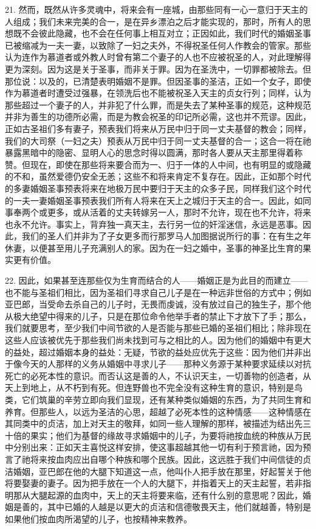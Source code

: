 21. 然而，既然从许多灵魂中，将来会有一座城，由那些同有一心一意归于天主的人组成；我们未来完美的合一，是在异乡漂泊之后才能实现的，那时，所有人的思想既不会彼此隐藏，也不会在任何事上相互对立；正因如此，我们时代的婚姻圣事已被缩减为一夫一妻，以致除了一妇之夫外，不得祝圣任何人作教会的管家。那些认为连作为慕道者或外教人时曾有第二个妻子的人也不应被祝圣的人，对此理解得更为深刻。因为这是关于圣事，而非关于罪。因为在圣洗中，一切罪都被除去。但那位说：以及的，已清楚表明婚姻不是罪。但因圣事的圣洁，正如一个女子，即使作为慕道者时遭受过强暴，在领洗后也不能被祝圣入天主的贞女行列；同样，认为那些超过一个妻子的人，并非犯了什么罪，而是失去了某种圣事的规范，这种规范并非为善生的功德所必需，而是为教会祝圣的印记所必需，这也并不荒谬。因此，正如古圣祖们多有妻子，预表我们将来从万民中归于同一丈夫基督的教会；同样，我们的大司祭（一妇之夫）预表从万民中归于同一丈夫基督的合一；这合一将在祂暴露黑暗中的隐密、显明人心的思念时得以圆满，那时各人要从天主那里得着称赞。但现在，即使在那些将来要合而为一、归于一体的人中间，也有明显的或隐藏的不和，虽然爱德仍安全无恙；这些不和将来肯定不复存在。因此，正如那个时代的多妻婚姻圣事预表将来在地极万民中要归于天主的众多子民，同样我们这个时代的一夫一妻婚姻圣事预表我们所有人将来在天上之城归于天主的合一。因此，如同事奉两个或更多，或从活着的丈夫转嫁另一人，那时不允许，现在也不允许，将来也永不允许。事实上，背弃独一真天主，去行另一位的奸淫迷信，永远是恶事。因此，我们的圣人们并非为了子女更多而行那罗马人加图据说所行的事：在有生之年休妻，以便甚至用儿子充满别人的家。因为在一妇之婚中，圣事的神圣比生育的果实更有价值。\par

22. 因此，如果甚至连那些仅为生育而结合的人——婚姻正是为此目的而建立——也不能与圣祖们相比，因为圣祖们寻求自己儿子是在一种远非世俗的方式中；例如亚巴郎，当受命去杀自己的儿子时，无畏而虔诚，没有放过自己的独生子，那个他从极大绝望中得来的儿子，只是在那位命令他举手者的禁止下才放下了手；那么，我们就要思考，至少我们中间节欲的人是否能与那些已婚的圣祖们相比；除非现在这些人应该被优先于那些我们尚未找到可与之相比的人。因为他们的婚姻中有更大的益处，超过婚姻本身的益处：无疑，节欲的益处应优先于这些：因为他们并非出于像今天的人那样的义务从婚姻中寻求儿子——那种义务源于某种要求延续以对抗死亡的必死本性的意识。而否认这是善的人，不认识天主，一切善物的创造者，从天上到地上，从不朽到有死。但连野兽也不完全没有这种生育的意识，特别是鸟类，它们筑巢的辛劳立即向我们显现，还有某种类似婚姻的东西，为了共同生育和养育。但那些人，以远为圣洁的心思，超越了必死本性的这种情感——这种情感在其同类中的贞洁，加上对天主的敬拜，如同一些人理解的那样，被描述为结出先三十倍的果实；他们为基督的缘故寻求婚姻中的儿子，为要将祂按血统的种族从万民中分别出来：正如天主喜悦这样安排，使这事超越其他一切有利于预言祂，因为预言了祂将来按血肉应出自哪个种族和哪个民族。因此，这远胜于我们中间信徒的贞洁婚姻，亚巴郎在他的大腿下知道这一点，他叫仆人把手放在那里，好起誓关于他将要娶妻的妻子。因为把手放在一个人的大腿下，并指着天上的天主起誓，若非指明那从大腿起源的血肉中，天上的天主将要来临，还有什么别的意思呢？因此，婚姻是善的，其中已婚的人越是以更大的贞洁和信德敬畏天主，他们就越善，特别是如果他们按血肉所渴望的儿子，也按精神来教养。\par

